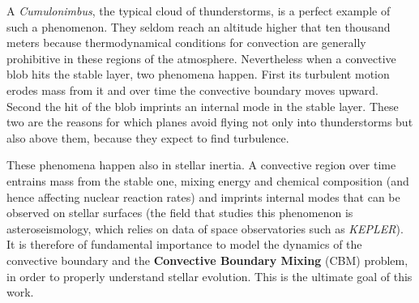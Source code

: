 A \textit{Cumulonimbus}, the typical cloud of thunderstorms, is a perfect example of such a phenomenon. They seldom reach an altitude higher that ten thousand meters because thermodynamical conditions for convection are generally prohibitive in these regions of the atmosphere. Nevertheless when a convective blob hits the stable layer, two phenomena happen. First its turbulent motion erodes mass from it and over time the convective boundary moves upward. Second the hit of the blob imprints an internal mode in the stable layer. These two are the reasons for which planes avoid flying not only into thunderstorms but also above them, because they expect to find turbulence. 

These phenomena happen also in stellar inertia. A convective region over time entrains mass from the stable one, mixing energy and chemical composition (and hence affecting nuclear reaction rates) and imprints internal modes that can be observed on stellar surfaces (the field that studies this phenomenon is asteroseismology, which relies on data of space observatories such as \textit{KEPLER}). It is therefore of fundamental importance to model the dynamics of the convective boundary and the \textbf{Convective Boundary Mixing} (CBM) problem, in order to properly understand stellar evolution. This is the ultimate goal of this work.

